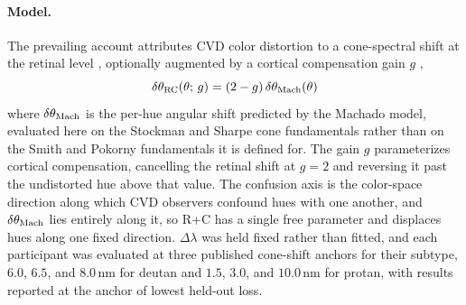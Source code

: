 \paragraph{Model.}
The prevailing account attributes CVD color distortion to a cone-spectral shift at the retinal level \parencite{machado2009}, optionally augmented by a cortical compensation gain $g$ \parencite{boehm2014,tregillus2021},
%
\begin{equation}
  \delta\theta_{\rm RC}(\theta;\,g)
    = (2 - g)\,\delta\theta_{\rm Mach}(\theta)
  \label{eq:rc}
\end{equation}
%
where $\delta\theta_{\rm Mach}$ is the per-hue angular shift predicted by the Machado model, evaluated here on the Stockman and Sharpe cone fundamentals \parencite{stockman2000} rather than on the Smith and Pokorny fundamentals it is defined for. The gain $g$ parameterizes cortical compensation, cancelling the retinal shift at $g = 2$ and reversing it past the undistorted hue above that value. The confusion axis is the color-space direction along which CVD observers confound hues with one another, and $\delta\theta_{\rm Mach}$ lies entirely along it, so R+C has a single free parameter and displaces hues along one fixed direction. $\Delta\lambda$ was held fixed rather than fitted, and each participant was evaluated at three published cone-shift anchors for their subtype, $6.0$, $6.5$, and $8.0$\,nm for deutan and $1.5$, $3.0$, and $10.0$\,nm for protan, with results reported at the anchor of lowest held-out loss.
